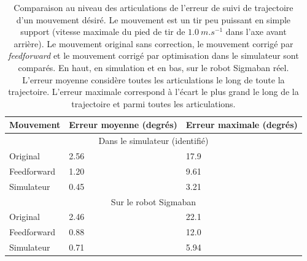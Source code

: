 \begin{table}[htb!]
    \centerfloat
    \small
    \begin{tabular}{|l|l|l|}
        \hline
        Mouvement & Erreur moyenne (degrés) & Erreur maximale (degrés) \\
        \hline
        \multicolumn{3}{|c|}{Dans le simulateur (identifié)} \\
        \hline
        Original & 2.56 & 17.9 \\
        Feedforward & 1.20 & 9.61 \\
        Simulateur & 0.45 & 3.21 \\
        \hline
        \multicolumn{3}{|c|}{Sur le robot Sigmaban} \\
        \hline
        Original & 2.46 & 22.1 \\
        Feedforward & 0.88 & 12.0 \\
        Simulateur & 0.71 & 5.94 \\
        \hline
    \end{tabular}
    \caption{\label{tab:motion_correction_feedforward}
        Comparaison au niveau des articulations de l'erreur de suivi
        de trajectoire d'un mouvement désiré.
        Le mouvement est un tir peu puissant en simple support 
        (vitesse maximale du pied de tir de $1.0~m.s^{-1}$ dans l'axe avant arrière).
        Le mouvement original sans correction, le mouvement corrigé par \textit{feedforward}
        et le mouvement corrigé par optimisation dans le simulateur sont comparés.
        En haut, en simulation et en bas, sur le robot Sigmaban réel.
        L'erreur moyenne considère toutes les articulations le long
        de toute la trajectoire.
        L'erreur maximale correspond à l'écart le plus grand le long de la trajectoire
        et parmi toutes les articulations.
    }
\end{table}

